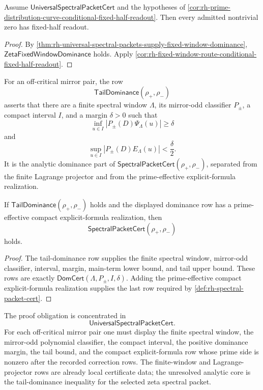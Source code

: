 \begin{corollary}
\label{cor:rh-universal-spectral-packets-conditional-fixed-half-readout}
Assume $\mathsf{UniversalSpectralPacketCert}$ and the hypotheses of
\autoref{cor:rh-prime-distribution-curve-conditional-fixed-half-readout}.
Then every admitted nontrivial zero has fixed-half readout.
\end{corollary}

\begin{proof}
By
\autoref{thm:rh-universal-spectral-packets-supply-fixed-window-dominance},
$\mathsf{ZetaFixedWindowDominance}$ holds.  Apply
\autoref{cor:rh-fixed-window-route-conditional-fixed-half-readout}.
\end{proof}

\begin{definition}[TailDominance]
\label{def:rh-tail-dominance}
For an off-critical mirror pair, the row
$$
\mathsf{TailDominance}(\rho_+,\rho_-)
$$
asserts that there are a finite spectral window $\Lambda$, its
mirror-odd classifier $P_\pm$, a compact interval $I$, and a margin
$\delta>0$ such that
$$
\inf_{u\in I}
\left|
P_\pm(D)\Psi_\Lambda(u)
\right|
\ge\delta
$$
and
$$
\sup_{u\in I}
\left|
P_\pm(D)E_\Lambda(u)
\right|
<
\frac{\delta}{2}.
$$
It is the analytic dominance part of
$\mathsf{SpectralPacketCert}(\rho_+,\rho_-)$, separated from the finite
Lagrange projector and from the prime-effective explicit-formula
realization.
\end{definition}

\begin{theorem}
\label{thm:rh-tail-dominance-packages-spectral-certificate}
If $\mathsf{TailDominance}(\rho_+,\rho_-)$ holds and the displayed
dominance row has a prime-effective compact explicit-formula
realization, then
$$
\mathsf{SpectralPacketCert}(\rho_+,\rho_-)
$$
holds.
\end{theorem}

\begin{proof}
The tail-dominance row supplies the finite spectral window, mirror-odd
classifier, interval, margin, main-term lower bound, and tail upper
bound.  These rows are exactly
$\mathsf{DomCert}(\Lambda,P_\pm,I,\delta)$.  Adding the
prime-effective compact explicit-formula realization supplies the last
row required by \autoref{def:rh-spectral-packet-cert}.
\end{proof}

\begin{principle}
\label{prin:rh-fixed-window-route-audit-boundary}
The proof obligation is concentrated in
$$
\mathsf{UniversalSpectralPacketCert}.
$$
For each off-critical mirror pair one must display the finite spectral
window, the mirror-odd polynomial classifier, the compact interval, the
positive dominance margin, the tail bound, and the compact
explicit-formula row whose prime side is nonzero after the recorded
correction rows.  The finite-window and Lagrange-projector rows are
already local certificate data; the unresolved analytic core is the
tail-dominance inequality for the selected zeta spectral packet.
\end{principle}
